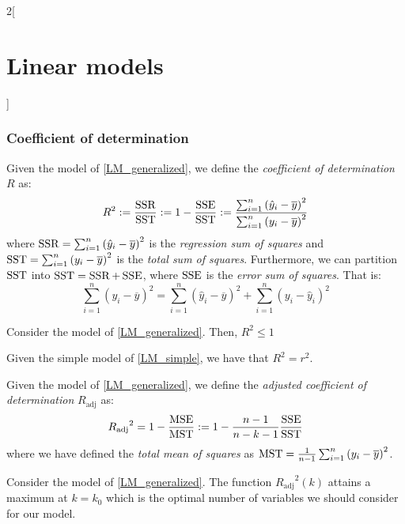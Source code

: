 \documentclass[../../../main_math.tex]{subfiles}
\begin{document}
\begin{multicols}{2}[\section{Linear models}]
  \subsubsection{Coefficient of determination}
  \begin{definition}
    Given the model of \cref{LM_generalized}, we define the \emph{coefficient of determination} $R$ as:
    $$R^2:=\frac{\operatorname{SSR}}{\operatorname{SST}}:=1-\frac{\operatorname{SSE}}{\operatorname{SST}}:=\frac{\sum_{i=1}^n{(\hat{y}_i-\overline{y})}^2}{\sum_{i=1}^n{(y_i-\overline{y})}^2}$$ where $\operatorname{SSR}=\sum_{i=1}^n{(\hat{y}_i-\overline{y})}^2$ is the \emph{regression sum of squares} and $\operatorname{SST}=\sum_{i=1}^n{(y_i-\overline{y})}^2$ is the \emph{total sum of squares}. Furthermore, we can partition $\operatorname{SST}$ into $\operatorname{SST}=\operatorname{SSR}+\operatorname{SSE}$, where $\operatorname{SSE}$ is the \emph{error sum of squares}. That is: $$\sum_{i=1}^n{(y_i-\overline{y})}^2=\sum_{i=1}^n{(\hat{y}_i-\overline{y})}^2+\sum_{i=1}^n{(y_i-\hat{y}_i)}^2$$
  \end{definition}
  \begin{lemma}
    Consider the model of \cref{LM_generalized}. Then, $R^2\leq 1$
  \end{lemma}
  \begin{proposition}
    Given the simple model of \cref{LM_simple}, we have that $R^2=r^2$.
  \end{proposition}
  \begin{definition}
    Given the model of \cref{LM_generalized}, we define the \emph{adjusted coefficient of determination} $R_{\mathrm{adj}}$ as: $${R_{\mathrm{adj}}}^2=1-\frac{\operatorname{MSE}}{\operatorname{MST}}:=1-\frac{n-1}{n-k-1}\frac{\operatorname{SSE}}{\operatorname{SST}}$$ where we have defined the \emph{total mean of squares} as $\operatorname{MST}=\frac{1}{n-1}\sum_{i=1}^n{(y_i-\overline{y})}^2$.
  \end{definition}
  \begin{lemma}
    Consider the model of \cref{LM_generalized}. The function ${R_{\mathrm{adj}}}^2(k)$ attains a maximum at $k=k_0$ which is the optimal number of variables we should consider for our model.
  \end{lemma}

\end{multicols}
\end{document}
